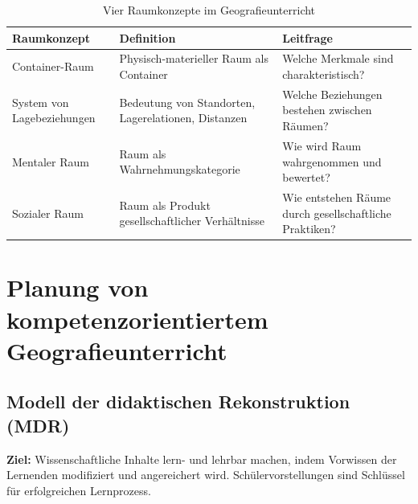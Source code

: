 \begin{table}[h!]
  \centering
  \begin{tabular}{@{}p{4cm}p{6cm}p{6cm}@{}}
    \toprule
    \textbf{Raumkonzept}       & \textbf{Definition}                                 & \textbf{Leitfrage}                                     \\
    \midrule
    Container-Raum             & Physisch-materieller Raum als Container             & Welche Merkmale sind charakteristisch?                 \\
    System von Lagebeziehungen & Bedeutung von Standorten, Lagerelationen, Distanzen & Welche Beziehungen bestehen zwischen Räumen?           \\
    Mentaler Raum              & Raum als Wahrnehmungskategorie                      & Wie wird Raum wahrgenommen und bewertet?               \\
    Sozialer Raum              & Raum als Produkt gesellschaftlicher Verhältnisse    & Wie entstehen Räume durch gesellschaftliche Praktiken? \\
    \bottomrule
  \end{tabular}
  \caption{Vier Raumkonzepte im Geografieunterricht}
\end{table}

\section{Planung von kompetenzorientiertem Geografieunterricht}
\subsection{Modell der didaktischen Rekonstruktion (MDR)}


\textbf{Ziel:} Wissenschaftliche Inhalte lern- und lehrbar machen, indem Vorwissen der Lernenden modifiziert und angereichert wird. Schülervorstellungen sind Schlüssel für erfolgreichen Lernprozess.

